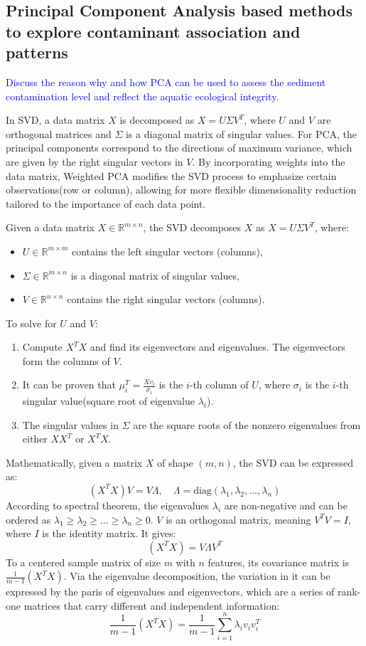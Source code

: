 \subsection{Principal Component Analysis based methods to explore contaminant association and patterns }

\textcolor{blue}{Discuss the reason why and how PCA can be used to assess the sediment contamination level and reflect the 
aquatic ecological integrity.}

In SVD, a data matrix $X$ is decomposed as $X = U \Sigma V^T$, where $U$ and $V$ are orthogonal matrices and
 $\Sigma$ is a diagonal matrix of singular values.
For PCA, the principal components correspond to
the directions of maximum variance, which are given by the right singular vectors in $V$.
By incorporating weights into the data matrix, Weighted PCA modifies the SVD process 
to emphasize certain observations(row or column), allowing for more flexible dimensionality reduction 
tailored to the importance of each data point.

Given a data matrix $X \in \mathbb{R}^{m \times n}$, the SVD decomposes $X$ as $X = U \Sigma V^T$, where:
\begin{itemize}
    \item $U \in \mathbb{R}^{m \times m}$ contains the left singular vectors (columns),
    \item $\Sigma \in \mathbb{R}^{m \times n}$ is a diagonal matrix of singular values,
    \item $V \in \mathbb{R}^{n \times n}$ contains the right singular vectors (columns).
\end{itemize}

To solve for $U$ and $V$:
\begin{enumerate}
    \item Compute $X^T X$ and find its eigenvectors and eigenvalues. The eigenvectors form the columns of $V$.
    \item It can be proven that \(\mu_i^T = \frac{X v_i}{\sigma_i}\) is the $i$-th column of $U$, where $\sigma_i$ is the $i$-th singular value(square root of eigenvalue \(\lambda_i\)).
    \item The singular values in $\Sigma$ are the square roots of the nonzero eigenvalues from either $X X^T$ or $X^T X$.
\end{enumerate}

Mathematically, given a matrix $X$ of shape $(m, n)$, the SVD can be expressed as: 
\[
(X^T X) V = V \Lambda, \quad \Lambda = \text{diag}(\lambda_1, \lambda_2, \ldots, \lambda_n)
\]
According to spectral theorem, the eigenvalues $\lambda_i$ are non-negative and can be ordered as $\lambda_1 \geq \lambda_2 \geq \ldots \geq \lambda_n \geq 0$.
\(V\) is an orthogonal matrix, meaning \(V^T V = I\), where \(I\) is the identity matrix.
It gives:
\[
(X^T X) = V \Lambda V^T
\]
To a centered sample matrix of size \(m\) with \(n\) features, its covariance matrix is \(\frac{1}{m-1} (X^T X)\).
Via the eigenvalue decomposition, the variation in it can be expressed by the paris of eigenvalues and eigenvectors,
which are a series of rank-one matrices that carry different and independent information:
\[
\frac{1}{m-1} (X^T X) = \frac{1}{m-1} \sum_{i=1}^{n} \lambda_i v_i v_i^T
\]

